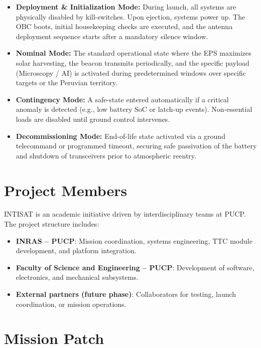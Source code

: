 \begin{itemize}
    \item \textbf{Deployment \& Initialization Mode:} During launch, all systems are physically disabled by kill-switches. Upon ejection, systems power up. The OBC boots, initial housekeeping checks are executed, and the antenna deployment sequence starts after a mandatory silence window. %
    
    \item \textbf{Nominal Mode:} The standard operational state where the EPS maximizes solar harvesting, the beacon transmits periodically, and the specific payload (Microscopy / AI) is activated during predetermined windows over specific targets or the Peruvian territory. %
    
    \item \textbf{Contingency Mode:} A safe-state entered automatically if a critical anomaly is detected (e.g., low battery SoC or latch-up events). Non-essential loads are disabled until ground control intervenes.
    
    \item \textbf{Decommissioning Mode:} End-of-life state activated via a ground telecommand or programmed timeout, securing safe passivation of the battery and shutdown of transceivers prior to atmospheric reentry.
\end{itemize}

\section{Project Members}
INTISAT is an academic initiative driven by interdisciplinary teams at PUCP. The project structure includes:
\begin{itemize}
    \item \textbf{INRAS – PUCP}: Mission coordination, systems engineering, TTC module development, and platform integration.
    \item \textbf{Faculty of Science and Engineering – PUCP}: Development of software, electronics, and mechanical subsystems.
    \item \textbf{External partners (future phase)}: Collaborators for testing, launch coordination, or mission operations.
\end{itemize}

\section{Mission Patch}
